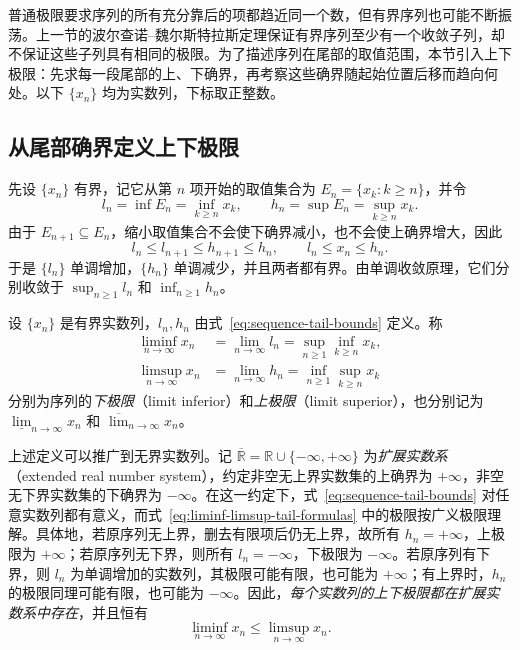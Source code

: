 \documentclass[UTF8,12pt,a4paper,fontset=fandol]{ctexbook}
\begin{document}
普通极限要求序列的所有充分靠后的项都趋近同一个数，但有界序列也可能不断振荡。上一节的波尔查诺--魏尔斯特拉斯定理保证有界序列至少有一个收敛子列，却不保证这些子列具有相同的极限。为了描述序列在尾部的取值范围，本节引入上下极限：先求每一段尾部的上、下确界，再考察这些确界随起始位置后移而趋向何处。以下 $\{x_n\}$ 均为实数列，下标取正整数。

\subsection{从尾部确界定义上下极限}
\label{subsec:liminf-limsup-definitions}

先设 $\{x_n\}$ 有界，记它从第 $n$ 项开始的取值集合为 $E_n=\{x_k:k\geq n\}$，并令
\begin{equation}
    l_n=\inf E_n=\inf_{k\geq n}x_k,
    \qquad h_n=\sup E_n=\sup_{k\geq n}x_k.
    \label{eq:sequence-tail-bounds}
\end{equation}
由于 $E_{n+1}\subseteq E_n$，缩小取值集合不会使下确界减小，也不会使上确界增大，因此
\[
    l_n\leq l_{n+1}\leq h_{n+1}\leq h_n,
    \qquad l_n\leq x_n\leq h_n.
\]
于是 $\{l_n\}$ 单调增加，$\{h_n\}$ 单调减少，并且两者都有界。由单调收敛原理，它们分别收敛于 $\sup_{n\geq1}l_n$ 和 $\inf_{n\geq1}h_n$。

\begin{definition}
\label{def:liminf-limsup}
设 $\{x_n\}$ 是有界实数列，$l_n,h_n$ 由式~\eqref{eq:sequence-tail-bounds} 定义。称
\begin{equation}
    \begin{aligned}
        \liminf_{n\to\infty}x_n
        &=\lim_{n\to\infty}l_n
        =\sup_{n\geq1}\inf_{k\geq n}x_k,\\
        \limsup_{n\to\infty}x_n
        &=\lim_{n\to\infty}h_n
        =\inf_{n\geq1}\sup_{k\geq n}x_k
    \end{aligned}
    \label{eq:liminf-limsup-tail-formulas}
\end{equation}
分别为序列的\emph{下极限}（limit inferior）和\emph{上极限}（limit superior），也分别记为 $\underline{\lim}_{n\to\infty}x_n$ 和 $\overline{\lim}_{n\to\infty}x_n$。
\end{definition}

上述定义可以推广到无界实数列。记 $\overline{\mathbb{R}}=\mathbb{R}\cup\{-\infty,+\infty\}$ 为\emph{扩展实数系}（extended real number system），约定非空无上界实数集的上确界为 $+\infty$，非空无下界实数集的下确界为 $-\infty$。在这一约定下，式~\eqref{eq:sequence-tail-bounds} 对任意实数列都有意义，而式~\eqref{eq:liminf-limsup-tail-formulas} 中的极限按广义极限理解。具体地，若原序列无上界，删去有限项后仍无上界，故所有 $h_n=+\infty$，上极限为 $+\infty$；若原序列无下界，则所有 $l_n=-\infty$，下极限为 $-\infty$。若原序列有下界，则 $l_n$ 为单调增加的实数列，其极限可能有限，也可能为 $+\infty$；有上界时，$h_n$ 的极限同理可能有限，也可能为 $-\infty$。因此，\emph{每个实数列的上下极限都在扩展实数系中存在}，并且恒有
\begin{equation}
    \liminf_{n\to\infty}x_n\leq\limsup_{n\to\infty}x_n.
    \label{eq:liminf-le-limsup}
\end{equation}
\end{document}
